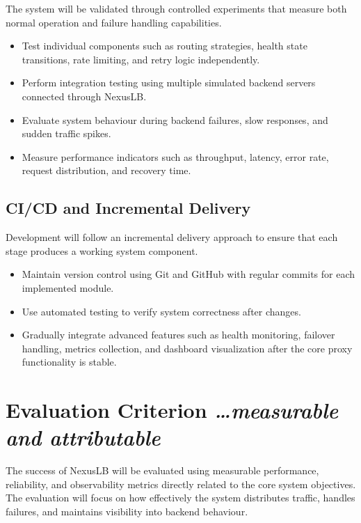 \documentclass[11pt,a4paper]{article}
\newcommand{\BvrHint}[1]{%
  {\normalfont\normalsize\itshape\hfill #1}}
\begin{document}
The system will be validated through controlled experiments that measure both normal operation and failure handling capabilities.

\begin{itemize}
    \item Test individual components such as routing strategies, health state transitions, rate limiting, and retry logic independently.

    \item Perform integration testing using multiple simulated backend servers connected through NexusLB.

    \item Evaluate system behaviour during backend failures, slow responses, and sudden traffic spikes.

    \item Measure performance indicators such as throughput, latency, error rate, request distribution, and recovery time.
\end{itemize}


\subsection{CI/CD and Incremental Delivery}

Development will follow an incremental delivery approach to ensure that each stage produces a working system component.

\begin{itemize}
    \item Maintain version control using Git and GitHub with regular commits for each implemented module.

    \item Use automated testing to verify system correctness after changes.

    \item Gradually integrate advanced features such as health monitoring, failover handling, metrics collection, and dashboard visualization after the core proxy functionality is stable.
\end{itemize}

\section{Evaluation Criterion %
\BvrHint{\ldots measurable and attributable}}

The success of NexusLB will be evaluated using measurable performance, reliability, and observability metrics directly related to the core system objectives. The evaluation will focus on how effectively the system distributes traffic, handles failures, and maintains visibility into backend behaviour.
\end{document}

